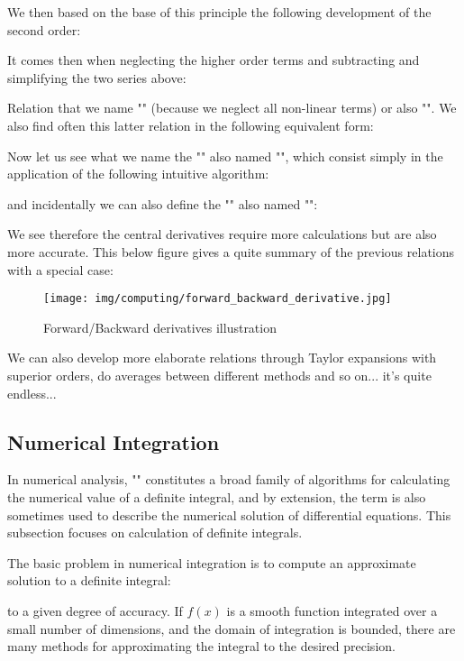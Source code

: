 	We then based on the base of this principle the following development of the second order:
	
	It comes then when neglecting the higher order terms and subtracting and simplifying the two series above:
	
	Relation that we name "" (because we neglect all non-linear terms) or also "". We also find often this latter relation in the following equivalent form:
	
	Now let us see what we name the "" also named "", which consist simply in the application of the following intuitive  algorithm:
	
	and incidentally we can also define the "" also named "":
	
	We see therefore the central derivatives require more calculations but are also more accurate. This below figure gives a quite summary of the previous relations with a special case:
	\begin{figure}[H]
		\centering
		\texttt{[image: img/computing/forward\_backward\_derivative.jpg]}
		\caption{Forward/Backward derivatives illustration}
	\end{figure}
	We can also develop more elaborate relations through Taylor expansions with superior orders, do averages between different methods and so on... it's quite endless...
	
	\pagebreak
	\subsection{Numerical Integration}
	In numerical analysis, "" constitutes a broad family of algorithms for calculating the numerical value of a definite integral, and by extension, the term is also sometimes used to describe the numerical solution of differential equations. This subsection focuses on calculation of definite integrals. 
	
	The basic problem in numerical integration is to compute an approximate solution to a definite integral:
	
	to a given degree of accuracy. If $f(x)$ is a smooth function integrated over a small number of dimensions, and the domain of integration is bounded, there are many methods for approximating the integral to the desired precision.
	
